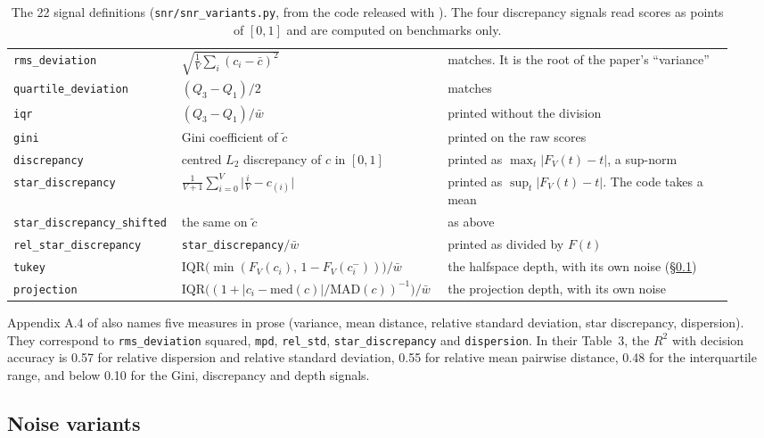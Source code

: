 \begin{table}[t]
\begin{tabular}{@{}p{0.19\linewidth}p{0.36\linewidth}p{0.39\linewidth}@{}}
\texttt{rms\_deviation} & $\sqrt{\frac{1}{V}\sum_i (c_i - \bar{c})^2}$ & matches. It is the root of the paper's ``variance'' \\
\texttt{quartile\_deviation} & $(Q_3 - Q_1)/2$ & matches \\
\texttt{iqr} & $(Q_3 - Q_1)/\bar{w}$ & printed without the division \\
\texttt{gini} & Gini coefficient of $\tilde{c}$ & printed on the raw scores \\
\texttt{discrepancy} & centred $L_2$ discrepancy of $c$ in $[0,1]$ & printed as $\max_t |F_V(t) - t|$, a sup-norm \\
\texttt{star\_discrepancy} & $\frac{1}{V+1}\sum_{i=0}^{V}\big|\tfrac{i}{V} - c_{(i)}\big|$ & printed as $\sup_t |F_V(t) - t|$. The code takes a mean \\
\texttt{star\_discrepancy\_shifted} & the same on $\tilde{c}$ & as above \\
\texttt{rel\_star\_discrepancy} & \texttt{star\_discrepancy}$/\bar{w}$ & printed as divided by $F(t)$ \\
\texttt{tukey} & $\mathrm{IQR}\big(\min(F_V(c_i),\, 1 - F_V(c_i^-))\big)/\bar{w}$ & the halfspace depth, with its own noise (\S\ref{app:sur-noise}) \\
\texttt{projection} & $\mathrm{IQR}\big((1 + |c_i - \mathrm{med}(c)|/\mathrm{MAD}(c))^{-1}\big)/\bar{w}$ & the projection depth, with its own noise \\
\bottomrule
\end{tabular}
\caption{The 22 signal definitions (\texttt{snr/snr\_variants.py}, from the code released with \citet{heineman_signal_2025}). The four discrepancy signals read scores as points of $[0,1]$ and are computed on benchmarks only.}
\label{tab:sur-signals}
\end{table}

Appendix A.4 of \citet{heineman_signal_2025} also names five measures in prose (variance, mean distance, relative standard deviation, star discrepancy, dispersion). They correspond to \texttt{rms\_deviation} squared, \texttt{mpd}, \texttt{rel\_std}, \texttt{star\_discrepancy} and \texttt{dispersion}.
In their Table~3, the $R^2$ with decision accuracy is 0.57 for relative dispersion and relative standard deviation, 0.55 for relative mean pairwise distance, 0.48 for the interquartile range, and below 0.10 for the Gini, discrepancy and depth signals.

\subsection{Noise variants}
\label{app:sur-noise}
\label{app:measuring-noise}
\label{app:total-variation}

